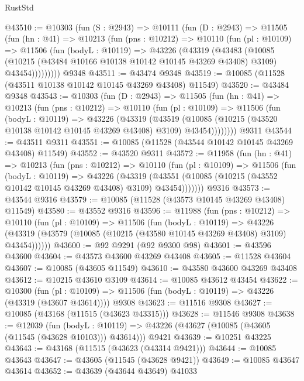 \begin{lexlean}{RustStd}
\begin{coremodule}
@43510 := @10303
    (fun (S : @2943) =>
    @10111
      (fun (D : @2943) =>
      @11505
        (fun (hn : @41) =>
        @10213
          (fun (pns : @10212) =>
          @10110
            (fun (pl : @10109) =>
            @11506
              (fun (bodyL : @10119) =>
              @43226
                (@43319
                  (@43483
                    (@10085
                      (@10215 (@43484 @10166 @10138 @10142 @10145 @43269 @43408) @3109)
                      @43454)))))))))
    @9348
@43511 := @43474 @9348
@43519 := @10085 (@11528 (@43511 @10138 @10142 @10145 @43269 @43408) @11549)
@43520 := @43484 @9348
@43543 := @10303
    (fun (D : @2943) =>
    @11505
      (fun (hn : @41) =>
      @10213
        (fun (pns : @10212) =>
        @10110
          (fun (pl : @10109) =>
          @11506
            (fun (bodyL : @10119) =>
            @43226
              (@43319
                (@43519
                  (@10085 (@10215 (@43520 @10138 @10142 @10145 @43269 @43408) @3109) @43454))))))))
    @9311
@43544 := @43511 @9311
@43551 := @10085 (@11528 (@43544 @10142 @10145 @43269 @43408) @11549)
@43552 := @43520 @9311
@43572 := @11958
    (fun (hn : @41) =>
    @10213
      (fun (pns : @10212) =>
      @10110
        (fun (pl : @10109) =>
        @11506
          (fun (bodyL : @10119) =>
          @43226
            (@43319
              (@43551 (@10085 (@10215 (@43552 @10142 @10145 @43269 @43408) @3109) @43454)))))))
    @9316
@43573 := @43544 @9316
@43579 := @10085 (@11528 (@43573 @10145 @43269 @43408) @11549)
@43580 := @43552 @9316
@43596 := @11988
    (fun (pns : @10212) =>
    @10110
      (fun (pl : @10109) =>
      @11506
        (fun (bodyL : @10119) =>
        @43226 (@43319 (@43579 (@10085 (@10215 (@43580 @10145 @43269 @43408) @3109) @43454))))))
@43600 := @92 @9291 (@92 @9300 @98)
@43601 := @43596 @43600
@43604 := @43573 @43600 @43269 @43408
@43605 := @11528 @43604
@43607 := @10085 (@43605 @11549)
@43610 := @43580 @43600 @43269 @43408
@43612 := @10215 @43610 @3109
@43614 := @10085 @43612 @43454
@43622 := @10300
    (fun (pl : @10109) => @11506 (fun (bodyL : @10119) => @43226 (@43319 (@43607 @43614))))
    @9308
@43623 := @11516 @9308
@43627 := @10085 (@43168 (@11515 (@43623 @43315)))
@43628 := @11546 @9308
@43638 := @12039
    (fun (bodyL : @10119) => @43226 (@43627 (@10085 (@43605 (@11545 (@43628 @10103))) @43614)))
    @9421
@43639 := @10251 @43225
@43643 := @43168 (@11515 (@43623 (@43314 @9421)))
@43644 := @10085 @43643
@43647 := @43605 (@11545 (@43628 @9421))
@43649 := @10085 @43647 @43614
@43652 := @43639 (@43644 @43649) @41033

\end{coremodule}
\end{lexlean}

